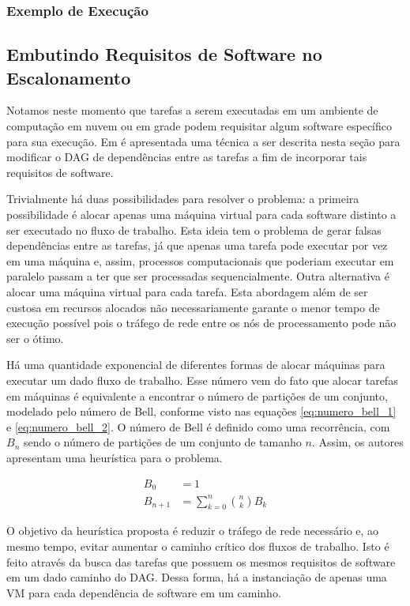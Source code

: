 \subsubsection{Exemplo de Execução}

\subsection{Embutindo Requisitos de Software no Escalonamento}
Notamos neste momento que tarefas a serem executadas em um ambiente de
computação em nuvem ou em grade podem requisitar algum software específico para
sua execução. Em \cite{batista:embedding_software_requirements} é apresentada
uma técnica a ser descrita nesta seção para modificar o DAG de dependências
entre as tarefas a fim de incorporar tais requisitos de software.

Trivialmente há duas possibilidades para resolver o problema: a primeira
possibilidade é alocar apenas uma máquina virtual para cada software distinto a
ser executado no fluxo de trabalho. Esta ideia tem o problema de gerar falsas
dependências entre as tarefas, já que apenas uma tarefa pode executar por vez 
em uma máquina e, assim, processos computacionais que poderiam executar em 
paralelo passam a ter que ser processadas sequencialmente. Outra alternativa é
alocar uma máquina virtual para cada tarefa. Esta abordagem além de ser custosa 
em recursos alocados não necessariamente garante o menor tempo de execução
possível pois o tráfego de rede entre os nós de processamento pode não ser o
ótimo.

Há uma quantidade exponencial de diferentes formas de alocar máquinas para 
executar um dado fluxo de trabalho. Esse número vem do fato que alocar tarefas
em máquinas é equivalente a encontrar o número de partições de um conjunto, 
modelado pelo número de Bell, conforme visto nas equações \ref{eq:numero_bell_1}
e \ref{eq:numero_bell_2}. O número de Bell é definido como uma recorrência,
com $B_n$ sendo o número de partições de um conjunto de tamanho $n$.
Assim, os autores apresentam uma heurística para o problema.

\begin{align} \label{eq:numero_bell_1}
	B_0 &= 1\\ \label{eq:numero_bell_2}
	B_{n+1} &= \sum_{k=0}^{n}{{n \choose k}B_k}
\end{align}

O objetivo da heurística proposta é reduzir o tráfego de rede necessário e, 
ao mesmo tempo, evitar aumentar o caminho crítico dos fluxos de trabalho.
Isto é feito através da busca das tarefas que possuem os mesmos requisitos de
software em um dado caminho do DAG. Dessa forma, há a instanciação de apenas uma
VM para cada dependência de software em um caminho.

